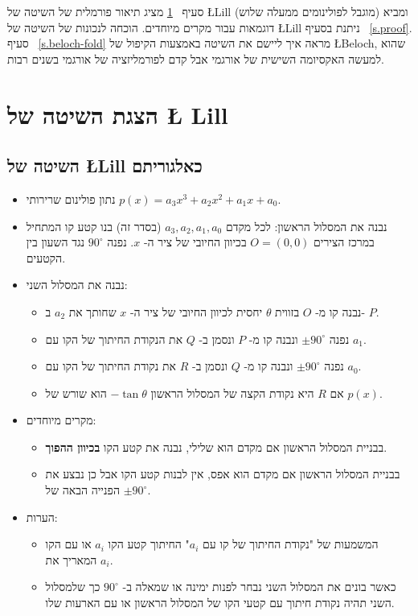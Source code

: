 סעיף%
~\ref{s.method}
מציג תיאור פורמלית של השיטה של
\L{Lill}
(מוגבל לפולינומים ממעלה שלוש) ומביא דוגמאות עבור מקרים מיוחדים. הוכחה לנכונות של השיטה של
\L{Lill}
ניתנת בסעיף%
~\ref{s.proof}.
סעיף%
~\ref{s.beloch-fold}
מראה איך ליישם את השיטה באמצעות הקיפול של
\L{Beloch},
שהוא למעשה האקסיומה השישית של אורגמי אבל קדם לפורמליזציה של אורגמי בשנים רבות.


\section{הצגת השיטה של
\L{ Lill}}\label{s.method}

\subsection{השיטה של 
\L{Lill}
כאלגוריתם}
\begin{itemize}
\item 
נתון פולינום שרירותי
$p(x)=a_3x^3+a_2x^2+a_1x+a_0$.
\item 
נבנה את המסלול הראשון: לכל מקדם
$a_3,a_2,a_1,a_0$
(בסדר זה) בנו קטע קו המתחיל במרכז הצירים
$O=(0,0)$
בכיוון החיובי של ציר ה-%
$x$.
נפנה
$90^\circ$
נגד השעון בין הקטעים.
\item 
נבנה את המסלול השני:
\begin{itemize}

\item
נבנה קו מ-%
$O$
בזווית 
$\theta$ 
יחסית לכיוון החיובי של ציר ה-%
$x$
שחותך את 
$a_2$
ב-%
$P$.
\item
נפנה
$\pm 90^\circ$
ונבנה קו מ-%
$P$
ונסמן ב-%
$Q$
את הנקודת החיתוך של הקו עם
$a_1$.
\item
נפנה
$\pm 90^\circ$
ונבנה קו מ-%
$Q$
ונסמן ב-%
$R$
את נקודת החיתוך של הקו עם
$a_0$.
\item
אם 
$R$
היא נקודת הקצה של המסלול הראשון
$-\tan\theta$
הוא שורש של 
$p(x)$.
\end{itemize}
\item
מקרים מיוחדים:
\begin{itemize}
\item 
בבניית המסלול הראשון אם מקדם הוא שלילי, נבנה את קטע הקו
\textbf{בכיוון ההפוך}.
\item
בבניית המסלול הראשון אם מקדם הוא אפס, אין לבנות קטע הקו אבל כן נבצע את הפנייה הבאה של
$\pm90^\circ$.
\end{itemize}
\item הערות:
\begin{itemize}
\item 
המשמעות של "נקודת החיתוך של קו עם
$a_i$"
החיתוך קטע הקו
$a_i$
או עם הקו המאריך את
$a_i$.
\item
כאשר בונים את המסלול השני נבחר לפנות ימינה או שמאלה ב-%
$90^\circ$
כך שלמסלול השני תהיה נקודת חיתוך עם קטעי הקו של המסלול הראשון או עם הארעות שלו.
\end{itemize}
\end{itemize}

